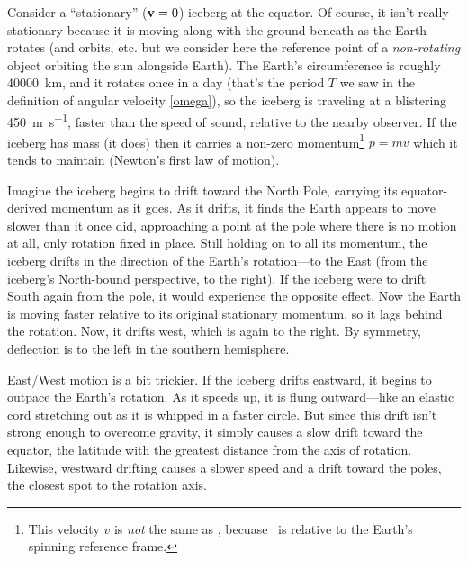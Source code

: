 Consider a ``stationary'' ($\textbf{v}=0$) iceberg at the equator. Of course, it isn't really stationary because it is moving along with the ground beneath as the Earth rotates (and orbits, etc. but we consider here the reference point of a \emph{non-rotating} object orbiting the sun alongside Earth). The Earth's circumference is roughly \qty{40000}{\km}, and it rotates once in a day (that's the period $T$ we saw in the definition of angular velocity \ref{omega}), so the iceberg is traveling at a blistering \qty{450}{\m\per\second}, faster than the speed of sound, relative to the nearby observer. If the iceberg has mass (it does) then it carries a non-zero momentum\footnote{This velocity $v$ is \emph{not} the same as \vV, becuase \vV\ is relative to the Earth's spinning reference frame.} $p=mv$ which it tends to maintain (Newton's first law of motion).

Imagine the iceberg begins to drift toward the North Pole, carrying its equator-derived momentum as it goes. As it drifts, it finds the Earth appears to move slower than it once did, approaching a point at the pole where there is no motion at all, only rotation fixed in place. Still holding on to all its momentum, the iceberg drifts in the direction of the Earth's rotation---to the East (from the iceberg's North-bound perspective, to the right). If the iceberg were to drift South again from the pole, it would experience the opposite effect. Now the Earth is moving faster relative to its original stationary momentum, so it lags behind the rotation. Now, it drifts west, which is again to the right. By symmetry, deflection is to the left in the southern hemisphere.

East/West motion is a bit trickier. If the iceberg drifts eastward, it begins to outpace the Earth's rotation. As it speeds up, it is flung outward---like an elastic cord stretching out as it is whipped in a faster circle. But since this drift isn't strong enough to overcome gravity, it simply causes a slow drift toward the equator, the latitude with the greatest distance from the axis of rotation. Likewise, westward drifting causes a slower speed and a drift toward the poles, the closest spot to the rotation axis.
